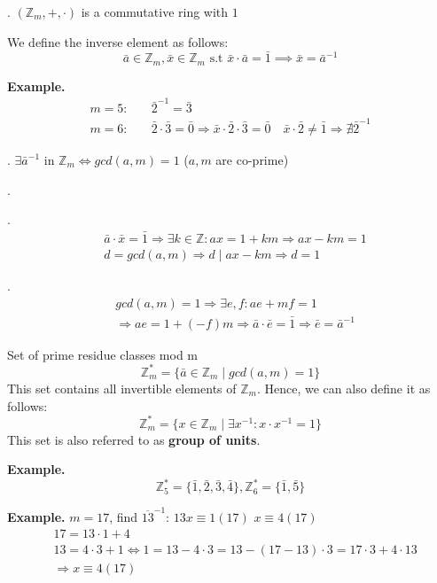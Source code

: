 \Theorem.
$(\mathbb{Z}_m, + , \cdot)$ is a commutative ring with $1$

\begin{definition}
  We define the inverse element as follows:
\[
  \bar{a} \in \mathbb{Z}_m, \bar{x} \in \mathbb{Z}_m \text{ s.t }
  \bar{x} \cdot \bar{a} = \bar{1} \implies \bar{x} = \bar{a}^{-1}
\]
\end{definition}

\textbf{Example.}
\begin{align*}
  m = 5: &\quad \bar{2}^{-1} = \bar{3} \\
  m = 6: &\quad \bar{2}\cdot\bar{3} = \bar{0} \Rightarrow \bar{x} \cdot \bar{2} \cdot \bar{3} = \bar{0} \quad \bar{x} \cdot \bar{2} \neq \bar{1} \Rightarrow \nexists \bar{2}^{-1}
\end{align*}

\Theorem.
$\exists \bar{a}^{-1} \text{ in } \mathbb{Z}_m \iff gcd(a,m) = 1$ ($a,m$ are co-prime)

\Proof.

\ProofForward.
\begin{align*}
  & \bar{a}\cdot \bar{x} = \bar{1} \Rightarrow \exists k\in \mathbb{Z}:
    ax = 1 + km \Rightarrow ax - km = 1\\
  & d = gcd(a,m) \Rightarrow d \mid ax - km \Rightarrow d = 1
\end{align*}

\ProofBackward.
\begin{align*}
  & gcd(a,m) = 1 \Rightarrow \exists e,f : ae + mf = 1\\
  & \Rightarrow ae = 1 + (-f)m \Rightarrow \bar{a} \cdot \bar{e} = \bar{1}
    \Rightarrow \bar{e} = \bar{a}^{-1}
\end{align*}


\begin{definition}
Set of prime residue classes mod m
\[
  \mathbb{Z}_m^{*} = \{ \bar{a} \in \mathbb{Z}_m \mid gcd(a,m) = 1 \}
\]
This set contains all invertible elements of $\mathbb{Z}_m$. Hence, we can also define it as follows:
\[
  \mathbb{Z}_m^{*} = \{ x \in \mathbb{Z}_m \mid \exists x^{-1} : x \cdot x^{-1} = 1 \}
\]
This set is also referred to as \textbf{group of units}.
\end{definition}

\textbf{Example.}
\[
  \mathbb{Z}_5^{*} = \{ \bar{1}, \bar{2}, \bar{3}, \bar{4} \}, \mathbb{Z}_6^{*} = \{ \bar{1}, \bar{5} \}
\]

\textbf{Example.}
$ m = 17$, find $\overline{13}^{-1}$: $ 13 x \equiv 1 (17)$ $x \equiv 4 (17)$
\begin{align*}
  & 17 = 13 \cdot  1 +4\\
  & 13 = 4\cdot 3 +1 \iff 1 = 13-4\cdot 3 = 13-(17-13)\cdot 3 = 17\cdot
    3+4\cdot 13 \\
  & \Rightarrow x \equiv 4 (17)
\end{align*}

